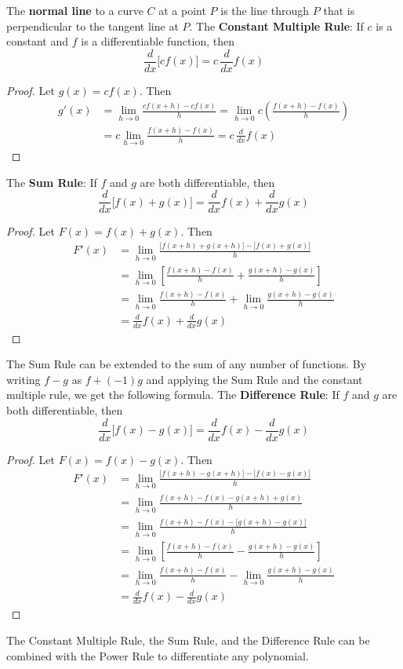 The \textbf{normal line} to a curve \(C\) at a point \(P\) is the line through
\(P\) that is perpendicular to the tangent line at \(P\).
The \textbf{Constant Multiple Rule}:
If \(c\) is a constant and \(f\) is a differentiable function, then
\[\frac{d}{dx}\bigl[cf(x)\bigr]=c\,\frac{d}{dx}f(x)\]
\begin{proof}
    Let \(g(x)=cf(x)\).
    Then
    \begin{align*}
        g'(x) &= \lim_{h\to 0}\frac{cf(x+h)-cf(x)}{h}
        =\lim_{h\to 0}c\left(\frac{f(x+h)-f(x)}{h}\right) \\
        &= c\lim_{h\to 0}\frac{f(x+h)-f(x)}{h}
        =c\,\frac{d}{dx}f(x)
    \end{align*}
\end{proof}
The \textbf{Sum Rule}: If \(f\) and \(g\) are both differentiable, then
\[\frac{d}{dx}\bigl[f(x)+g(x)\bigr]=\frac{d}{dx}f(x)+\frac{d}{dx}g(x)\]
\begin{proof}
    Let \(F(x)=f(x)+g(x)\).
    Then
    \begin{align*}
        F'(x) &= \lim_{h\to 0}
        \frac{\bigl[f(x+h)+g(x+h)\bigr]-\bigl[f(x)+g(x)\bigr]}{h} \\
        &= \lim_{h\to 0}
        \left[\frac{f(x+h)-f(x)}{h}+\frac{g(x+h)-g(x)}{h}\right] \\
        &= \lim_{h\to 0}\frac{f(x+h)-f(x)}{h}
        +\lim_{h\to 0}\frac{g(x+h)-g(x)}{h} \\
        &= \frac{d}{dx}f(x)+\frac{d}{dx}g(x)
    \end{align*}
\end{proof}
The Sum Rule can be extended to the sum of any number of functions.
By writing \(f-g\) as \(f+(-1)g\) and applying the Sum Rule and the constant
multiple rule, we get the following formula.
The \textbf{Difference Rule}: If \(f\) and \(g\) are both differentiable, then
\[\frac{d}{dx}\bigl[f(x)-g(x)\bigr]=\frac{d}{dx}f(x)-\frac{d}{dx}g(x)\]
\begin{proof}
    Let \(F(x)=f(x)-g(x)\).
    Then
    \begin{align*}
        F'(x) &= \lim_{h\to 0}
        \frac{\bigl[f(x+h)-g(x+h)\bigr]-\bigl[f(x)-g(x)\bigr]}{h} \\
        &= \lim_{h\to 0}\frac{f(x+h)-f(x)-g(x+h)+g(x)}{h} \\
        &= \lim_{h\to 0}\frac{f(x+h)-f(x)-\bigl[g(x+h)-g(x)\bigr]}{h} \\
        & =\lim_{h\to 0}
        \left[\frac{f(x+h)-f(x)}{h}-\frac{g(x+h)-g(x)}{h}\right] \\
        &= \lim_{h\to 0}
        \frac{f(x+h)-f(x)}{h}-\lim_{h\to 0}\frac{g(x+h)-g(x)}{h} \\
        &= \frac{d}{dx}f(x)-\frac{d}{dx}g(x)
    \end{align*}
\end{proof}
The Constant Multiple Rule, the Sum Rule, and the Difference Rule can be
combined with the Power Rule to differentiate any polynomial.

